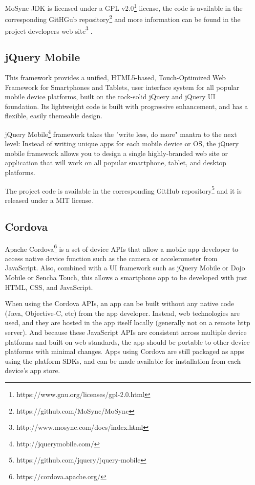 \documentclass[a4paper,12pt]{book}
\begin{document}
MoSync JDK is licensed under a GPL v2.0\footnote{https://www.gnu.org/licenses/gpl-2.0.html}  license, the code is available in the corresponding GitHGub repository\footnote{https://github.com/MoSync/MoSync}  and more information can be found in the project developers web site\footnote{http://www.mosync.com/docs/index.html} .

\subsection{jQuery Mobile}
\label{jQuery Mobile}

This framework provides a unified, HTML5-based, Touch-Optimized Web Framework for Smartphones and Tablets, user interface system for all popular mobile device platforms, built on the rock-solid jQuery and jQuery UI foundation. Its lightweight code is built with progressive enhancement, and has a flexible, easily themeable design.

jQuery Mobile\footnote{http://jquerymobile.com/}  framework takes the "write less, do more" mantra to the next level: Instead of writing unique apps for each mobile device or OS, the jQuery mobile framework allows you to design a single highly-branded web site or application that will work on all popular smartphone, tablet, and desktop platforms.

The project code is available in the corresponding GitHub repository\footnote{https://github.com/jquery/jquery-mobile} and it is released under a MIT license.

\subsection{Cordova}
\label{Cordova} 

Apache Cordova\footnote{https://cordova.apache.org/} is a set of device APIs that allow a mobile app developer to access native device function such as the camera or accelerometer from JavaScript. Also, combined with a UI framework such as jQuery Mobile or Dojo Mobile or Sencha Touch, this allows a smartphone app to be developed with just HTML, CSS, and JavaScript.

When using the Cordova APIs, an app can be built without any native code (Java, Objective-C, etc) from the app developer. Instead, web technologies are used, and they are hosted in the app itself locally (generally not on a remote http server). And because these JavaScript APIs are consistent across multiple device platforms and built on web standards, the app should be portable to other device platforms with minimal changes. Apps using Cordova are still packaged as apps using the platform SDKs, and can be made available for installation from each device's app store.
\end{document}
